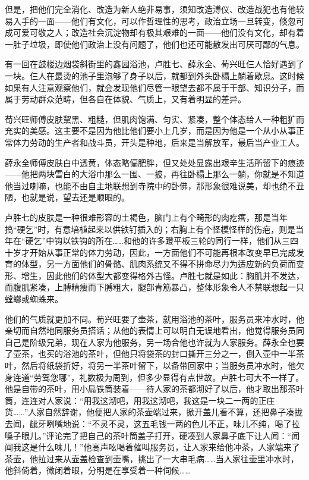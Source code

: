 \par 但是，把他们完全消化、改造为新人绝非易事，须知改造溥仪、改造战犯也有他较易入手的一面——他们有文化，可以作哲理性的思考，政治立场一旦转变，倏忽可成可爱可敬之人；改造社会沉淀物却有极其艰难的一面——他们没有文化，却有着一肚子垃圾，即使他们政治上没有问题了，他们也还可能散发出可厌可鄙的气息。
\par 有一回在鼓楼边烟袋斜街里的鑫园浴池，卢胜七、薛永全、荀兴旺仨人恰好遇到了一块。仨人在最烫的池子里泡够了身子以后，就都到外头卧榻上躺着歇息。这时候如果有人注意观察他们，就会发现他们尽管一眼望去都不属于干部、知识分子，而属于劳动群众范畴，但各自在体貌、气质上，又有着明显的差异。
\par 荀兴旺师傅皮肤黧黑、粗糙，但肌肉饱满、匀实、紧凑，整个体态给人一种粗犷而充实的美感。这主要不是因为他比他们要小上几岁，而是因为他是一个从小从事正常体力劳动的生产者和战斗员，开头是种地，后来是当解放军，最后当产业工人。
\par 薛永全师傅皮肤白中透黄，体态略偏肥胖，但又处处显露出艰辛生活所留下的痕迹——他把两块雪白的大浴巾那么一围、一披，再往卧榻上那么一躺，你就是不知道他当过喇嘛，也能不由自主地联想到寺院中的卧佛，那形象很难说美，却也绝不丑陋，也就是说，望去还是顺眼的。
\par 卢胜七的皮肤是一种很难形容的土褐色，脑门上有个畸形的肉疙瘩，那是当年搞“硬乞”时，有意培植起来以供铁钉插入的；右胸上有个怪模怪样的伤疤，则是当年在“硬乞”中钩以铁钩的所在……和他的许多蹬平板三轮的同行一样，他们从三四十岁才开始从事正常的体力劳动，因此，一方面他们不可能再根本改变早已完成发育的体型，另一方面他们的骨骼、肌肉系统又不得不拼命尽力为适应新的负荷而变形、增生，因此他们的体型大都变得格外古怪。卢胜七就是如此：胸肌并不发达，而腹肌紧凑，上膊精瘦而下膊粗大，腿部青筋暴凸，整体形象令人不禁联想起一只螳螂或蜘蛛来。
\par 他们的气质就更加不同。荀兴旺要了壶茶，就用浴池的茶叶，服务员来冲水时，他亲切而自然地同服务员搭话；从他的表情上可以明白无误地看出，他觉得服务员同自己是阶级兄弟，现在人家为他服务，另一场合他也许就为人家服务。薛永全也要了壶茶，也买的浴池的茶叶，但他只将袋茶的封口撕开三分之一，倒入壶中一半茶叶，然后将纸袋折好，将另一半茶叶留下，以备带回家中；当服务员冲水时，他欠身连道“劳驾您哪”，礼数极为周到，但多少显得有点世故。卢胜七可大不一样了。他是自带的茶叶，用小扁铁筒装着——待人家的茶都沏好了以后，他才取出那茶叶筒，连连对人家说：“用我这沏吧，用我这沏吧，我这是一块二一两的正庄货……”人家自然辞谢，他便把人家的茶壶端过来，掀开盖儿看不算，还把鼻子凑拢去闻，龇牙咧嘴地说：“不灵不灵，这五毛钱一两的色儿不正，味儿不纯，喝了拉嗓子眼儿。”评论完了把自己的茶叶筒盖子打开，硬凑到人家鼻子底下让人闻：“闻闻我这是什么味儿！”他高声吆喝着催叫服务员，让人家来给他冲茶，人家端来了茶壶，他拉过来从壶盖检查到壶嘴，挑出了一大串毛病……当人家往壶里冲水时，他斜倚着，微闭着眼，分明是在享受着一种伺候……
